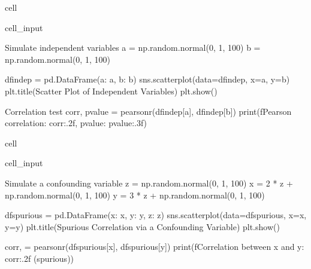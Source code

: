 \documentclass[letterpaper,10pt,english]{jupyterBook}
\begin{document}
\begin{sphinxuseclass}{cell}\begin{sphinxVerbatimInput}

\begin{sphinxuseclass}{cell_input}
\begin{sphinxVerbatim}[commandchars=\\\{\}]

\PYGZsh{} Simulate independent variables
a = np.random.normal(0, 1, 100)
b = np.random.normal(0, 1, 100)

df\PYGZus{}indep = pd.DataFrame(\PYGZob{}\PYGZsq{}a\PYGZsq{}: a, \PYGZsq{}b\PYGZsq{}: b\PYGZcb{})
sns.scatterplot(data=df\PYGZus{}indep, x=\PYGZsq{}a\PYGZsq{}, y=\PYGZsq{}b\PYGZsq{})
plt.title(\PYGZsq{}Scatter Plot of Independent Variables\PYGZsq{})
plt.show()

\PYGZsh{} Correlation test
corr, p\PYGZus{}value = pearsonr(df\PYGZus{}indep[\PYGZsq{}a\PYGZsq{}], df\PYGZus{}indep[\PYGZsq{}b\PYGZsq{}])
print(f\PYGZdq{}Pearson correlation: \PYGZob{}corr:.2f\PYGZcb{}, p\PYGZhy{}value: \PYGZob{}p\PYGZus{}value:.3f\PYGZcb{}\PYGZdq{})
\end{sphinxVerbatim}

\end{sphinxuseclass}\end{sphinxVerbatimInput}

\end{sphinxuseclass}
\begin{sphinxuseclass}{cell}\begin{sphinxVerbatimInput}

\begin{sphinxuseclass}{cell_input}
\begin{sphinxVerbatim}[commandchars=\\\{\}]

\PYGZsh{} Simulate a confounding variable
z = np.random.normal(0, 1, 100)
x = 2 * z + np.random.normal(0, 1, 100)
y = \PYGZhy{}3 * z + np.random.normal(0, 1, 100)

df\PYGZus{}spurious = pd.DataFrame(\PYGZob{}\PYGZsq{}x\PYGZsq{}: x, \PYGZsq{}y\PYGZsq{}: y, \PYGZsq{}z\PYGZsq{}: z\PYGZcb{})
sns.scatterplot(data=df\PYGZus{}spurious, x=\PYGZsq{}x\PYGZsq{}, y=\PYGZsq{}y\PYGZsq{})
plt.title(\PYGZsq{}Spurious Correlation via a Confounding Variable\PYGZsq{})
plt.show()

corr, \PYGZus{} = pearsonr(df\PYGZus{}spurious[\PYGZsq{}x\PYGZsq{}], df\PYGZus{}spurious[\PYGZsq{}y\PYGZsq{}])
print(f\PYGZdq{}Correlation between x and y: \PYGZob{}corr:.2f\PYGZcb{} (spurious)\PYGZdq{})
\end{sphinxVerbatim}

\end{sphinxuseclass}\end{sphinxVerbatimInput}

\end{sphinxuseclass}
\end{document}
